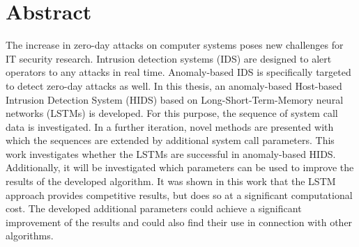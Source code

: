 \begingroup
\let\clearpage\relax
\let\cleardoublepage\relax
\let\cleardoublepage\relax

\chapter*{Abstract}
 The increase in zero-day attacks on computer systems poses new challenges for IT security research.
 Intrusion detection systems (IDS) are designed to alert operators to any attacks in real time.
 Anomaly-based IDS is specifically targeted to detect zero-day attacks as well.
 In this thesis, an anomaly-based Host-based Intrusion Detection System (HIDS) based on Long-Short-Term-Memory neural networks (LSTMs) is developed.
 For this purpose, the sequence of system call data is investigated.
 In a further iteration, novel methods are presented with which the sequences are extended by additional system call parameters.
 This work investigates whether the LSTMs are successful in anomaly-based HIDS.\@
 Additionally, it will be investigated which parameters can be used to improve the results of the developed algorithm.
 It was shown in this work that the LSTM approach provides competitive results, but does so at a significant computational cost.
 The developed additional parameters could achieve a significant improvement of the results and could also find their use in connection with other algorithms.

\vfill

